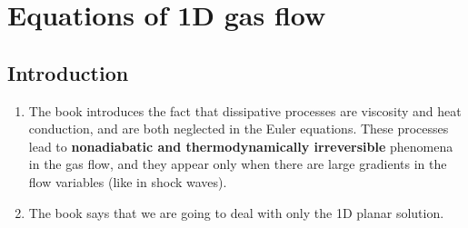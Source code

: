 ﻿\documentclass[11pt]{article}
\begin{document}
\section{Equations of 1D gas flow}
\subsection{Introduction}
\begin{enumerate}
  \item The book introduces the fact that dissipative processes are viscosity and heat conduction, and are both neglected in the Euler equations. These processes lead to \textbf{nonadiabatic and thermodynamically irreversible} phenomena in the gas flow, and they appear only when there are large gradients in the flow variables (like in shock waves).
  \item The book says that we are going to deal with only the 1D planar solution.
\end{enumerate}
\end{document}
